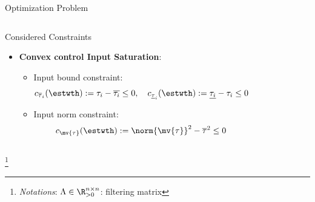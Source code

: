 \documentclass[8pt, aspectratio=169]{beamer}
\begin{document}
\begin{frame}{\insertsubsectionhead}{Optimization Problem}
\begin{columns}
\begin{block}{Considered Constraints}
\begin{itemize}
        \item \textbf{Convex control Input Saturation}: 
          \begin{itemize}
            \item Input bound constraint:
            \begin{equation}\label{eq:cstr:input_bound}
              c_{\overline{\tau}_i}(\estwth)
              :=
              \tau_i - \overline{\tau_i}
              \le 
              0
              ,
              \quad
              c_{\underline{\tau}_i}(\estwth)
              :=
              \underline{\tau_i} - \tau_i
              \le 
              0
            \end{equation}
            \item Input norm constraint:
            \begin{equation}\label{eq:cstr:input_norm}
              c_{\mv{\tau}}(\estwth)
              :=
              \norm{\mv{\tau}}^2 - \overline{\tau}^2
              \le
              0
            \end{equation}
        \end{itemize}
      \end{itemize}
      
    \end{block}

  \end{columns}

  \let\thefootnote\relax\footnote{
    \textit{Notations}: 
    $\Lambda\in\R_{>0}^{n\times n}$: filtering matrix
  }

\end{frame}
\end{document}
